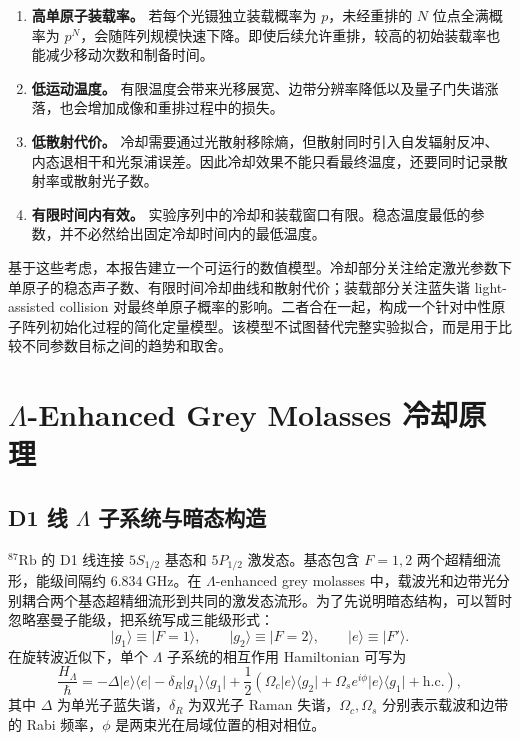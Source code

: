 \documentclass[UTF8,a4paper,12pt]{ctexart}
\newcommand{\Rb}{\ensuremath{^{87}\mathrm{Rb}}}
\newcommand{\ket}[1]{\ensuremath{|#1\rangle}}
\newcommand{\bra}[1]{\ensuremath{\langle #1|}}
\begin{document}
\begin{enumerate}
  \item \textbf{高单原子装载率。} 若每个光镊独立装载概率为 $p$，未经重排的 $N$ 位点全满概率为 $p^N$，会随阵列规模快速下降。即使后续允许重排，较高的初始装载率也能减少移动次数和制备时间。
  \item \textbf{低运动温度。} 有限温度会带来光移展宽、边带分辨率降低以及量子门失谐涨落，也会增加成像和重排过程中的损失。
  \item \textbf{低散射代价。} 冷却需要通过光散射移除熵，但散射同时引入自发辐射反冲、内态退相干和光泵浦误差。因此冷却效果不能只看最终温度，还要同时记录散射率或散射光子数。
  \item \textbf{有限时间内有效。} 实验序列中的冷却和装载窗口有限。稳态温度最低的参数，并不必然给出固定冷却时间内的最低温度。
\end{enumerate}

基于这些考虑，本报告建立一个可运行的数值模型。冷却部分关注给定激光参数下单原子的稳态声子数、有限时间冷却曲线和散射代价；装载部分关注蓝失谐 light-assisted collision 对最终单原子概率的影响。二者合在一起，构成一个针对中性原子阵列初始化过程的简化定量模型。该模型不试图替代完整实验拟合，而是用于比较不同参数目标之间的趋势和取舍。

\section{$\Lambda$-Enhanced Grey Molasses 冷却原理}

\subsection{D1 线 $\Lambda$ 子系统与暗态构造}

\Rb{} 的 D1 线连接 $5S_{1/2}$ 基态和 $5P_{1/2}$ 激发态。基态包含 $F=1,2$ 两个超精细流形，能级间隔约 $6.834~\mathrm{GHz}$。在 $\Lambda$-enhanced grey molasses 中，载波光和边带光分别耦合两个基态超精细流形到共同的激发态流形。为了先说明暗态结构，可以暂时忽略塞曼子能级，把系统写成三能级形式：
\[
\ket{g_1}\equiv \ket{F=1},\qquad
\ket{g_2}\equiv \ket{F=2},\qquad
\ket{e}\equiv \ket{F'}.
\]
在旋转波近似下，单个 $\Lambda$ 子系统的相互作用 Hamiltonian 可写为
\begin{equation}
\frac{H_\Lambda}{\hbar}
=-\Delta\ket{e}\bra{e}
-\delta_R\ket{g_1}\bra{g_1}
+\frac{1}{2}\left(
\Omega_c \ket{e}\bra{g_2}
+\Omega_s e^{i\phi}\ket{e}\bra{g_1}
+\mathrm{h.c.}
\right),
\label{eq:lambda_hamiltonian}
\end{equation}
其中 $\Delta$ 为单光子蓝失谐，$\delta_R$ 为双光子 Raman 失谐，$\Omega_c,\Omega_s$ 分别表示载波和边带的 Rabi 频率，$\phi$ 是两束光在局域位置的相对相位。
\end{document}
